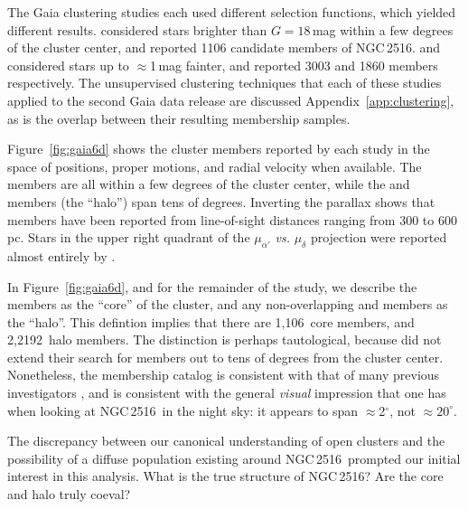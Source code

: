 \documentclass[12pt,twocolumn,tighten]{aastex63}
\newcommand{\cn}{NGC\,2516} %
\newcommand{\ncore}{1{,}106}  %
\newcommand{\nhalo}{2{,}2192} %
\begin{document}
The Gaia clustering studies each used different selection functions,
which yielded different results.  
considered stars brighter than $G=18$\,mag within a few degrees of the
cluster center, and reported 1106 candidate members of \cn.
 and 
considered stars up to $\approx$1\,mag fainter, and reported 3003 and
1860 members respectively.  The unsupervised clustering techniques
that each of these studies applied to the second Gaia data release are
discussed Appendix~\ref{app:clustering}, as is the overlap between
their resulting membership samples.

Figure~\ref{fig:gaia6d} shows the cluster members reported by each
study in the space of positions, proper motions, and radial velocity
when available.  The  members are
all within a few degrees of the cluster center, while the
 and 
members (the ``halo'') span tens of degrees. 
Inverting the parallax shows that members have been reported from
line-of-sight distances ranging from $300$ to $600\,$pc.
Stars in the upper right quadrant of the $\mu_{\alpha'}$ {\it vs.}
$\mu_\delta$ projection were reported almost entirely by
\citet{meingast_2021}.

In Figure~\ref{fig:gaia6d}, and for the remainder of the study, we
describe the  members as the
``core'' of the cluster, and any non-overlapping
 and 
members as the ``halo''.  This defintion implies that there are
\ncore\ core members, and \nhalo\ halo members.  The distinction is
perhaps tautological, because  did
not extend their search for members out to tens of degrees from the
cluster center.  Nonetheless, the 
membership catalog is consistent with that of many previous
investigators \citep[{\it
e.g.},][]{jeffries_ngc2516_2001,Kharchenko_et_al_2013}, and is
consistent with the general {\it visual} impression that one has when
looking at \cn\ in the night sky: it appears to span
$\approx$2$^\circ$, not $\approx20^\circ$.

The discrepancy between our canonical understanding of open clusters
and the possibility of a diffuse population existing around \cn\
prompted our initial interest in this analysis.  What is the true
structure of \cn?  Are the core and halo truly coeval?
\end{document}
